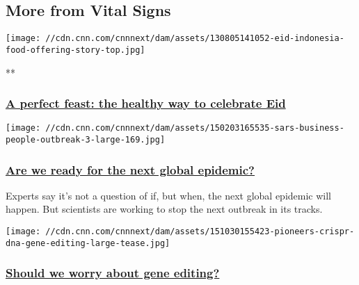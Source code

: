 \hypertarget{more-from-vital-signs-}{%
\subsection{More from Vital Signs~}\label{more-from-vital-signs-}}

\href{/2016/07/04/health/gallery/perfect-feast-celebrate-eid-al-fitr/index.html}{}

\texttt{[image: //cdn.cnn.com/cnnnext/dam/assets/130805141052-eid-indonesia-food-offering-story-top.jpg]}

**

\hypertarget{a-perfect-feast-the-healthy-way-to-celebrate-eid-}{%
\subsubsection{\texorpdfstring{\href{/2016/07/04/health/gallery/perfect-feast-celebrate-eid-al-fitr/index.html}{A
perfect feast: the healthy way to celebrate Eid
}}{A perfect feast: the healthy way to celebrate Eid }}\label{a-perfect-feast-the-healthy-way-to-celebrate-eid-}}

\href{/2015/02/13/health/are-we-ready-for-global-outbreak/index.html}{}

\texttt{[image: //cdn.cnn.com/cnnnext/dam/assets/150203165535-sars-business-people-outbreak-3-large-169.jpg]}

\hypertarget{are-we-ready-for-the-next-global-epidemic}{%
\subsubsection{\texorpdfstring{\href{/2015/02/13/health/are-we-ready-for-global-outbreak/index.html}{Are
we ready for the next global
epidemic?}}{Are we ready for the next global epidemic?}}\label{are-we-ready-for-the-next-global-epidemic}}

Experts say it's not a question of if, but when, the next global
epidemic will happen. But scientists are working to stop the next
outbreak in its tracks.

\href{/2016/02/10/opinions/gene-editing-klitzman/index.html}{}

\texttt{[image: //cdn.cnn.com/cnnnext/dam/assets/151030155423-pioneers-crispr-dna-gene-editing-large-tease.jpg]}

\hypertarget{should-we-worry-about-gene-editing}{%
\subsubsection{\texorpdfstring{\href{/2016/02/10/opinions/gene-editing-klitzman/index.html}{Should
we worry about gene
editing?}}{Should we worry about gene editing?}}\label{should-we-worry-about-gene-editing}}

